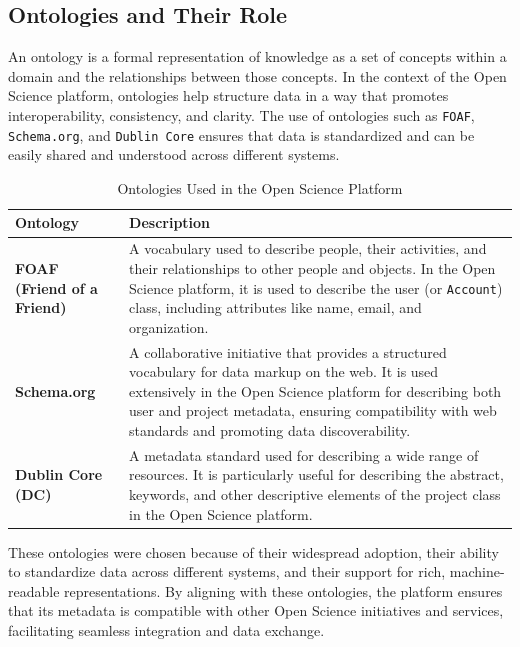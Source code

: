 \documentclass{article}
\begin{document}
\subsection{Ontologies and Their Role}
An ontology is a formal representation of knowledge as a set of concepts within a domain and the relationships between those concepts. In the context of the Open Science platform, ontologies help structure data in a way that promotes interoperability, consistency, and clarity. The use of ontologies such as \texttt{FOAF}, \texttt{Schema.org}, and \texttt{Dublin Core} ensures that data is standardized and can be easily shared and understood across different systems.

\begin{table}[h]
      \centering
      \begin{tabular}{|l|l|}
            \hline
            \textbf{Ontology}                  & \textbf{Description}                                                                                                                                                                                                                                                          \\ \hline
            \textbf{FOAF (Friend of a Friend)} & A vocabulary used to describe people, their activities, and their relationships to other people and objects. In the Open Science platform, it is used to describe the user (or \texttt{Account}) class, including attributes like name, email, and organization.              \\ \hline
            \textbf{Schema.org}                & A collaborative initiative that provides a structured vocabulary for data markup on the web. It is used extensively in the Open Science platform for describing both user and project metadata, ensuring compatibility with web standards and promoting data discoverability. \\ \hline
            \textbf{Dublin Core (DC)}          & A metadata standard used for describing a wide range of resources. It is particularly useful for describing the abstract, keywords, and other descriptive elements of the project class in the Open Science platform.                                                         \\ \hline
      \end{tabular}
      \caption{Ontologies Used in the Open Science Platform}
\end{table}

These ontologies were chosen because of their widespread adoption, their ability to standardize data across different systems, and their support for rich, machine-readable representations. By aligning with these ontologies, the platform ensures that its metadata is compatible with other Open Science initiatives and services, facilitating seamless integration and data exchange.
\end{document}
